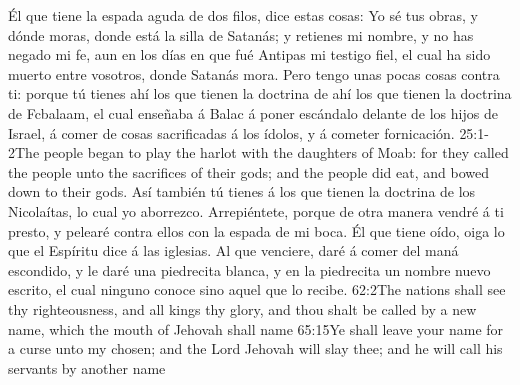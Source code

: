 Él que tiene la espada aguda de dos filos,%
 dice estas cosas:
Yo sé tus obras, y dónde moras,%
 donde está la silla de Satanás; y retienes mi nombre, y no has negado mi fe, aun en los días en que fué Antipas mi testigo fiel, el cual ha sido muerto entre vosotros, donde Satanás mora. %
Pero tengo unas pocas cosas contra ti: porque tú tienes ahí los que tienen la doctrina de ahí los que tienen la doctrina de Fcbalaam, el cual enseñaba á Balac á poner escándalo delante de los hijos de Israel, á comer de cosas sacrificadas á los ídolos, y á cometer fornicación.%
								{25:1-2}{The people began to play the harlot with the daughters of Moab: for they called the people unto the sacrifices of their gods; and the people did eat, and bowed down to their gods.}
Así también tú tienes á los que tienen la doctrina de los Nicolaítas, lo cual yo aborrezco. %
Arrepiéntete, porque de otra manera vendré á ti presto, y pelearé contra ellos con la espada de mi boca.%
Él que tiene oído, oiga lo que el Espíritu dice á las iglesias. Al que venciere, daré á comer del maná escondido,%
 y le daré una piedrecita blanca, y en la piedrecita un nombre nuevo escrito, el cual ninguno conoce sino aquel que lo recibe.
					{62:2}{The nations shall see thy righteousness, and all kings thy glory, and thou shalt be called by a new name, which the mouth of Jehovah shall name}
					{65:15}{Ye shall leave your name for a curse unto my chosen; and the Lord Jehovah will slay thee; and he will call his servants by another name}
